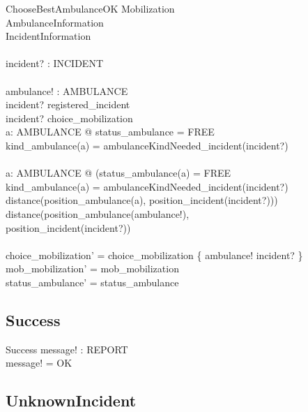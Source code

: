 \documentclass{report}
\begin{document}
\begin{schema}{ChooseBestAmbulanceOK}
	\Delta Mobilization 	\\
	\Xi AmbulanceInformation\\
	\Xi IncidentInformation	\\
	\newline				\\
	incident? : INCIDENT	\\
	\newline				\\
	ambulance! : AMBULANCE	\\
  \where
  	incident? \in registered\_incident \\
  	incident? \notin \ran choice\_mobilization \\
  	\exists a: AMBULANCE @ status\_ambulance = FREE \land \\
  	 kind\_ambulance(a) = ambulanceKindNeeded\_incident(incident?) \\
  	\newline \\
  	\forall a: AMBULANCE @ (status\_ambulance(a) = FREE \land \\
  	 kind\_ambulance(a) = ambulanceKindNeeded\_incident(incident?) \land \\
  	 distance(position\_ambulance(a), position\_incident(incident?))) \\
  	 \geq distance(position\_ambulance(ambulance!), \\
  	 position\_incident(incident?))\\
  	\newline \\
  	choice\_mobilization' = choice\_mobilization \oplus \{ ambulance! \mapsto incident? \} \\
  	mob\_mobilization' = mob\_mobilization \\
  	status\_ambulance' = status\_ambulance %
\end{schema}

\subsection{Success}

\begin{schema}{Success}
	message! : REPORT	\\
  \where				
	message! = OK		\\
\end{schema}

\subsection{UnknownIncident}
\end{document}
